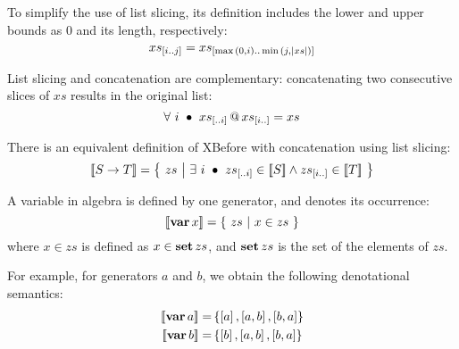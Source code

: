 To simplify the use of list slicing, its definition includes the lower and upper bounds as $0$ and its length, respectively:
%
\begin{equation}
xs_{\left[i..j\right]} = 
	xs_{\left[\max{\left(0,i\right)}..\min{\left(j,\ensuremath\left|xs\right|\right)}\right]}
\end{equation}

List slicing and concatenation are complementary: concatenating two consecutive slices of $xs$ results in the original list:
\begin{equation}
\label{law:slice-append}
\forall~ i ~\bullet~ xs_{\left[..i\right]} \operatorname{\mathbf{@}} xs_{\left[i..\right]} = xs
\end{equation}

There is an equivalent definition of \ac{XBefore} with concatenation using list slicing:
%
\begin{equation}
\label{def:xbefore-slice}
\left[\!\left[S \rightarrow T\right]\!\right] =
  \left\{~
    zs ~\middle|~ \exists~ i ~\bullet~ zs_{\left[..i\right]} \in \left[\!\left[S\right]\!\right] \land zs_{\left[i..\right]} \in \left[\!\left[T\right]\!\right]
  ~\right\}
\end{equation}

A variable in \ac{algebra} is defined by one generator, and denotes its occurrence:
%
\begin{equation}
\label{def:var}
\left[\!\left[\operatorname{\mathbf{var}} x\right]\!\right] =
  \left\{~
    zs ~\middle|~ x \in zs
  ~\right\}
\end{equation}
%
where $x \in zs$ is defined as $x \in \operatorname{\mathbf{set}} zs$, and $\operatorname{\mathbf{set}} zs$ is the set of the elements of $zs$.

For example, for generators $a$ and $b$, we obtain the following denotational semantics:
%
\begin{subequations}
\begin{align}
\denote{\var{a}} = & \left\{\listsin{a}, \listsin{a,b}, \listsin{b,a}\right\}\label{eq:denotational-var-a}\\
%
\denote{\var{b}} = & \left\{\listsin{b}, \listsin{a,b}, \listsin{b,a}\right\}\label{eq:denotational-var-b}
\end{align}
\end{subequations}


